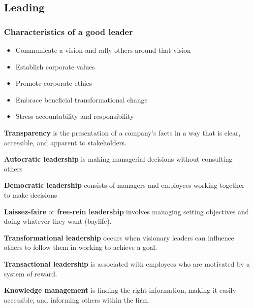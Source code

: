 \documentclass[english, 12pt]{article}
\begin{document}
\subsection{Leading}
\subsubsection*{Characteristics of a good leader}
\begin{itemize}
\item Communicate a vision and rally others around that vision
\item Establish corporate values
\item Promote corporate ethics
\item Embrace beneficial transformational change
\item Stress accountability and responsibility
\end{itemize}
\begin{defn}
\textbf{Transparency} is the presentation of a company's facts in a way that is clear, accessible, and apparent to stakeholders.
\end{defn}
\begin{defn}
\textbf{Autocratic leadership} is making managerial decisions without consulting others
\end{defn}
\begin{defn}
\textbf{Democratic leadership} consists of managers and employees working together to make decisions
\end{defn}
\begin{defn}
\textbf{Laissez-faire} or \textbf{free-rein leadership} involves managing setting objectives and doing whatever they want (baylife).
\end{defn}
\begin{defn}
\textbf{Transformational leadership} occurs when visionary leaders can influence others to follow them in working to achieve a goal.
\end{defn}
\begin{defn}
\textbf{Transactional leadership} is associated with employees who are motivated by a system of reward.
\end{defn}
\begin{defn}
\textbf{Knowledge management} is finding the right information, making it easily accessible, and informing others within the firm.
\end{defn}
\end{document}
